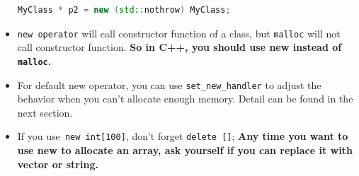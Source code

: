 \documentclass[a4paper,11pt,twoside]{book}
\begin{document}
\begin{itemize}
\begin{lstlisting}[frame=single, language=c++]
MyClass * p2 = new (std::nothrow) MyClass; 
\end{lstlisting}


	\item \texttt{new operator} will call constructor function of a class, but \texttt{malloc} will not call constructor function.  \textbf{So in C++, you should use new instead of \texttt{malloc}.}
	
	\item For default new operator, you can use \texttt{set\_new\_handler} to adjust the behavior when you can't allocate enough memory. Detail can be found in the next section.
	
	
	\item If you use\texttt{ new int[100]}, don't forget \texttt{delete []};  \textbf{Any time you want to use new to allocate an array, ask yourself if you can replace it with vector or string.}
\end{itemize}
\end{document}
